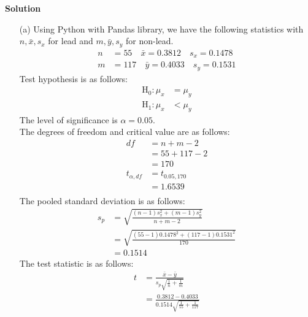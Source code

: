 \documentclass{uofa-eng-assignment}
\begin{document}
\begin{enumerate}
        \textbf{Solution}
        \begin{enumerate}
            \item[(a)]
                Using Python with Pandas library, we have the following statistics with
                $n, \bar{x}, s_x$ for lead and $m, \bar{y}, s_y$ for non-lead.
                \begin{align*}
                    n & = 55 \quad \bar{x} = 0.3812 \quad s_x = 0.1478  \\
                    m & = 117 \quad \bar{y} = 0.4033 \quad s_y = 0.1531
                \end{align*}
                Test hypothesis is as follows:
                \begin{align*}
                    \text{H}_0: \mu_{x} & = \mu_{y} \\
                    \text{H}_1: \mu_{x} & < \mu_{y}
                \end{align*}
                The level of significance is $\alpha = 0.05$. \\
                The degrees of freedom and critical value are as follows:
                \begin{align*}
                    df             & = n + m - 2     \\
                                   & = 55 + 117 - 2  \\
                                   & = 170           \\
                    t_{\alpha, df} & = t_{0.05, 170} \\
                                   & = 1.6539        \\
                \end{align*}
                The pooled standard deviation is as follows:
                \begin{align*}
                    s_p & = \sqrt{\frac{(n - 1)s_x^2 + (m - 1)s_y^2}{n + m - 2}}    \\
                        & = \sqrt{\frac{(55 - 1)0.1478^2 + (117 - 1)0.1531^2}{170}} \\
                        & = 0.1514
                \end{align*}
                The test statistic is as follows:
                \begin{align*}
                    t & = \frac{\bar{x} - \bar{y}}{s_p\sqrt{\frac{1}{n} + \frac{1}{m}}}     \\
                      & = \frac{0.3812 - 0.4033}{0.1514\sqrt{\frac{1}{55} + \frac{1}{117}}} \\

\end{align*}
\end{enumerate}
\end{enumerate}
\end{document}
